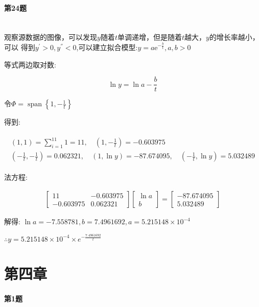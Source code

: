 \documentclass[a4paper]{article}
\begin{document}
\paragraph{第24题}~{}
\\

观察源数据的图像，可以发现$y$随着$t$单调递增，但是随着$t$越大，$y$的增长率越小，可以
得到$y^{'}>0, y^{''} <0$,可以建立拟合模型:$y=a \mathrm{e}^{-\frac{b}{t}}, a,b>0$\par
等式两边取对数:\par
$$\ln y=\ln a-\frac{b}{t} $$\par
令$\Phi=\operatorname{span}\left\{1,-\frac{1}{t}\right\}$\par
得到:\par
\begin{eqnarray}
    \begin{array}{c}(1,1)=\sum_{i=1}^{11} 1=11, \quad\left(1,-\frac{1}{t}\right)=-0.603975 \\ \left(-\frac{1}{t},-\frac{1}{t}\right)=0.062321, \quad(1, \ln y)=-87.674095, \quad\left(-\frac{1}{t}, \ln y\right)=5.032489\end{array}
\end{eqnarray}\par
法方程:\par
\begin{eqnarray}
    \left[\begin{array}{cc}11 & -0.603975 \\ -0.603975 & 0.062321\end{array}\right]\left[\begin{array}{c}{\ln a} \\ b\end{array}\right]=\left[\begin{array}{c}-87.674095 \\ 5.032489\end{array}\right]
\end{eqnarray}\par
解得:
$\ln a=-7.558781, b=7.4961692, a=5.215148 \times 10^{-4}$\par
$\therefore y=5.215148 \times 10^{-4} \times e^{-\frac{7.4961692}{t}}$

{\centering\section*{第四章}}

\paragraph{第1题}~{}
\\
\end{document}
